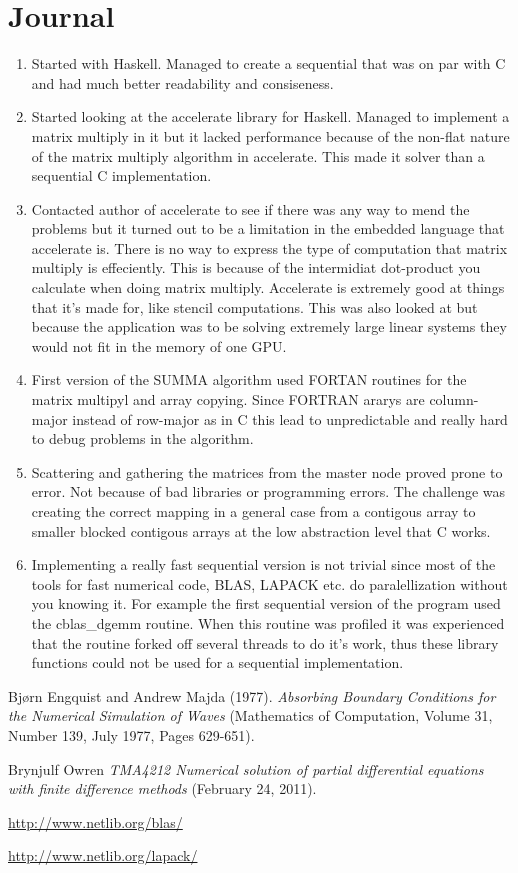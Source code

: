 \documentclass{article}
\begin{document}
\section{Journal}
\begin{enumerate}
	\item Started with Haskell. Managed to create a sequential that was on par with C and had much better readability and consiseness.
	\item Started looking at the accelerate library for Haskell. Managed to implement a matrix multiply in it but it lacked performance because of the non-flat nature of the matrix multiply algorithm in accelerate. This made it solver than a sequential C implementation.
	\item Contacted author of accelerate to see if there was any way to mend the problems but it turned out to be a limitation in the embedded language that accelerate is. There is no way to express the type of computation that matrix multiply is effeciently. This is because of the intermidiat dot-product you calculate when doing matrix multiply. Accelerate is extremely good at things that it's made for, like stencil computations. This was also looked at but because the application was to be solving extremely large linear systems they would not fit in the memory of one GPU.
	\item First version of the SUMMA algorithm used FORTAN routines for the matrix multipyl and array copying. Since FORTRAN ararys are column-major instead of row-major as in C this lead to unpredictable and really hard to debug problems in the algorithm.
	\item Scattering and gathering the matrices from the master node proved prone to error. Not because of bad libraries or programming errors. The challenge was creating the correct mapping in a general case from a contigous array to smaller blocked contigous arrays at the low abstraction level that C works.
	\item Implementing a really fast sequential version is not trivial since most of the tools for fast numerical code, BLAS, LAPACK etc. do paralellization without you knowing it. For example the first sequential version of the program used the cblas\_dgemm routine. When this routine was profiled it was experienced that the routine forked off several threads to do it's work, thus these library functions could not be used for a sequential implementation.
\end{enumerate}


\begin{thebibliography}{9}

  Bjørn Engquist and Andrew Majda (1977).
  \emph{Absorbing Boundary Conditions for the Numerical Simulation of Waves}
  (Mathematics of Computation, Volume 31, Number 139,
  July 1977, Pages 629-651).

  Brynjulf Owren
  \emph{TMA4212 Numerical solution of partial differential equations with finite difference methods}
  (February 24, 2011).

  \url{http://www.netlib.org/blas/}

  \url{http://www.netlib.org/lapack/}

\end{thebibliography}
\end{document}
